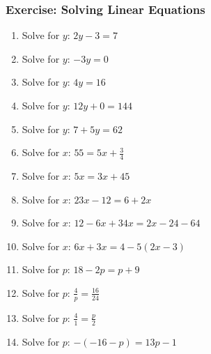             \subsubsection{ Exercise: Solving Linear Equations }
            \nopagebreak
        \label{m39241*id148396}\begin{enumerate}[noitemsep, label=\textbf{\arabic*}. ] 
            \label{m39241*uid11}\item Solve for $y$: $2y-3=7$\hspace{1ex}        
\label{m39241*uid12}\item Solve for $y$: $-3y=0$\hspace{1ex}        
\label{m39241*uid13}\item Solve for $y$: $4y=16$\hspace{1ex}        
\label{m39241*uid14}\item Solve for $y$: $12y+0=144$\hspace{1ex}        
\label{m39241*uid15}\item Solve for $y$: $7+5y=62$\hspace{1ex}        
\label{m39241*uid16}\item Solve for $x$: $55=5x+\frac{3}{4}$\hspace{1ex}        
\label{m39241*uid17}\item Solve for $x$: $5x=3x+45$\hspace{1ex}        
\label{m39241*uid18}\item Solve for $x$: $23x-12=6+2x$\hspace{1ex}        
\label{m39241*uid19}\item Solve for $x$: $12-6x+34x=2x-24-64$\hspace{1ex}        
\label{m39241*uid20}\item Solve for $x$: $6x+3x=4-5\left(2x-3\right)$\hspace{1ex}        
\label{m39241*uid21}\item Solve for $p$: $18-2p=p+9$\hspace{1ex}        
\label{m39241*uid22}\item Solve for $p$: $\frac{4}{p}=\frac{16}{24}$\hspace{1ex}        
\label{m39241*uid23}\item Solve for $p$: $\frac{4}{1}=\frac{p}{2}$\hspace{1ex}        
\label{m39241*uid24}\item Solve for $p$: $-\left(-16-p\right)=13p-1$\hspace{1ex}        

\end{enumerate}
